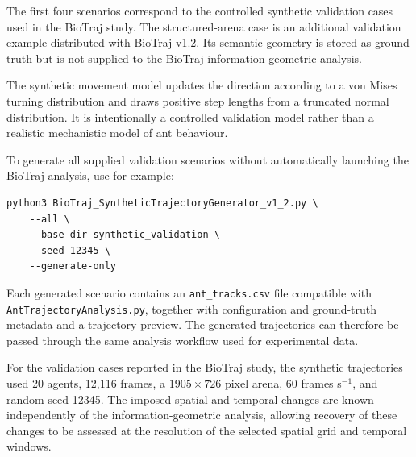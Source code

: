 \documentclass[11pt,a4paper]{article}
\begin{document}
The first four scenarios correspond to the controlled synthetic validation
cases used in the BioTraj study. The structured-arena case is an additional
validation example distributed with BioTraj v1.2. Its semantic geometry is
stored as ground truth but is not supplied to the BioTraj information-geometric
analysis.

The synthetic movement model updates the direction according to a von Mises
turning distribution and draws positive step lengths from a truncated normal
distribution. It is intentionally a controlled validation model rather than a
realistic mechanistic model of ant behaviour.

To generate all supplied validation scenarios without automatically launching
the BioTraj analysis, use for example:
\begin{lstlisting}
python3 BioTraj_SyntheticTrajectoryGenerator_v1_2.py \
    --all \
    --base-dir synthetic_validation \
    --seed 12345 \
    --generate-only
\end{lstlisting}

Each generated scenario contains an \texttt{ant\_tracks.csv} file compatible
with \texttt{AntTrajectoryAnalysis.py}, together with configuration and
ground-truth metadata and a trajectory preview. The generated trajectories can
therefore be passed through the same analysis workflow used for experimental
data.

For the validation cases reported in the BioTraj study, the synthetic
trajectories used 20 agents, 12,116 frames, a $1905\times726$ pixel arena,
60 frames s$^{-1}$, and random seed 12345. The imposed spatial and temporal
changes are known independently of the information-geometric analysis, allowing
recovery of these changes to be assessed at the resolution of the selected
spatial grid and temporal windows.
\end{document}
